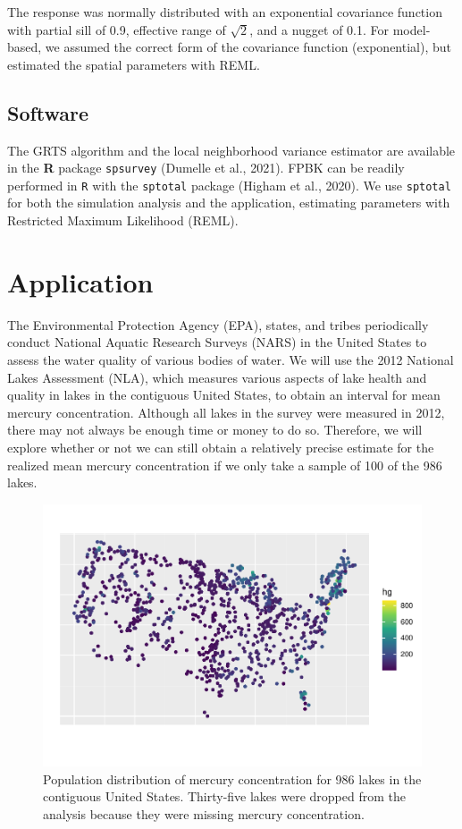 \documentclass[]{elsarticle} %
\begin{document}
The response was normally distributed with an exponential covariance
function with partial sill of 0.9, effective range of \(\sqrt{2}\), and
a nugget of 0.1. For model-based, we assumed the correct form of the
covariance function (exponential), but estimated the spatial parameters
with REML.

\hypertarget{software}{%
\subsection{Software}\label{software}}

The GRTS algorithm and the local neighborhood variance estimator are
available in the \textbf{\textsf{R}} package \texttt{spsurvey} (Dumelle
et al., 2021). FPBK can be readily performed in \texttt{R} with the
\texttt{sptotal} package (Higham et al., 2020). We use \texttt{sptotal}
for both the simulation analysis and the application, estimating
parameters with Restricted Maximum Likelihood (REML).

\hypertarget{application}{%
\section{Application}\label{application}}

The Environmental Protection Agency (EPA), states, and tribes
periodically conduct National Aquatic Research Surveys (NARS) in the
United States to assess the water quality of various bodies of water. We
will use the 2012 National Lakes Assessment (NLA), which measures
various aspects of lake health and quality in lakes in the contiguous
United States, to obtain an interval for mean mercury concentration.
Although all lakes in the survey were measured in 2012, there may not
always be enough time or money to do so. Therefore, we will explore
whether or not we can still obtain a relatively precise estimate for the
realized mean mercury concentration if we only take a sample of 100 of
the 986 lakes.

\begin{figure}
\includegraphics[width=1\linewidth]{SpatialDVM_Manuscript_files/figure-latex/figdata-1} \caption{Population distribution of mercury concentration for 986 lakes in the contiguous United States. Thirty-five lakes were dropped from the analysis because they were missing mercury concentration.}\label{fig:figdata}
\end{figure}
\end{document}
